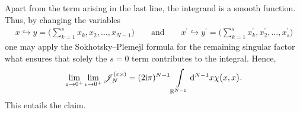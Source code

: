 Apart from the term arising in the last line, the integrand is a smooth function. Thus, by changing the variables
\begin{gather*}
x\hookrightarrow y=\bigg( \sum_{k=1}^{s}x_k ,x_2,\dots, x_{N-1} \bigg) \qquad \text{and} \qquad
x^{\prime}\hookrightarrow y^{\prime}=\bigg( \sum_{k=1}^{s} x_k^{\prime},x_2^{\prime},\dots, x_{s}^{\prime} \bigg)
\end{gather*}
one may apply the Sokhotsky--Plemejl formula for the remaining singular factor what ensures that solely the $s=0$ term contributes to the
integral. Hence,{\samepage
\begin{gather*}
 \lim_{\varepsilon\rightarrow 0^+} \lim_{\epsilon \rightarrow 0^+ } \mathscr{J}_N^{(\varepsilon;\epsilon)} = (2 {\rm i}\pi)^{N-1}
 \int\limits_{\mathbb{R}^{N-1}}{} {\rm d}^{N-1}x \chi\big( x, x\big) .
\end{gather*}
This entails the claim.}

